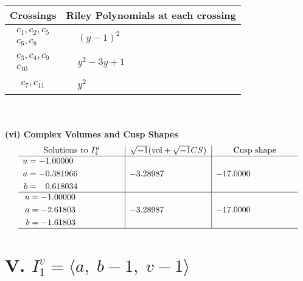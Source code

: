 \documentclass[1p]{elsarticle_modified}
\theoremstyle{definition}
\newcommand{\I}{\sqrt{-1}}
\begin{document}
\begin{tabular}{m{50pt}|m{274pt}}
Crossings & \hspace{64pt}Riley Polynomials at each crossing \\
\hline $$\begin{aligned}c_{1},c_{2},c_{5}\\c_{6},c_{8}\end{aligned}$$&$\begin{aligned}
&(y-1)^2
\end{aligned}$\\
\hline $$\begin{aligned}c_{3},c_{4},c_{9}\\c_{10}\end{aligned}$$&$\begin{aligned}
&y^2-3 y+1
\end{aligned}$\\
\hline $$\begin{aligned}c_{7},c_{11}\end{aligned}$$&$\begin{aligned}
&y^2
\end{aligned}$\\
\hline
\end{tabular}\\~\\
\newpage\flushleft \textbf{(vi) Complex Volumes and Cusp Shapes}
$$\begin{array}{c|c|c}  
\text{Solutions to }I^u_{4}& \I (\text{vol} + \sqrt{-1}CS) & \text{Cusp shape}\\
 \hline 
\begin{aligned}
u &= -1.00000\phantom{ +0.000000I} \\
a &= -0.381966\phantom{ +0.000000I} \\
b &= \phantom{-}0.618034\phantom{ +0.000000I}\end{aligned}
 & -3.28987\phantom{ +0.000000I} & -17.0000\phantom{ +0.000000I} \\ \hline\begin{aligned}
u &= -1.00000\phantom{ +0.000000I} \\
a &= -2.61803\phantom{ +0.000000I} \\
b &= -1.61803\phantom{ +0.000000I}\end{aligned}
 & -3.28987\phantom{ +0.000000I} & -17.0000\phantom{ +0.000000I}\\
 \hline 
 \end{array}$$\newpage\newpage\renewcommand{\arraystretch}{1}
\centering \section*{V. $I^v_{1}= \langle a,\;b-1,\;v-1 \rangle$}
\end{document}
